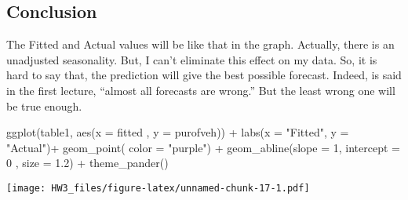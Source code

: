 \documentclass[
]{article}
\newenvironment{Shaded}{\begin{snugshade}}{\end{snugshade}}
\newcommand{\AttributeTok}[1]{\textcolor[rgb]{0.77,0.63,0.00}{#1}}
\newcommand{\DecValTok}[1]{\textcolor[rgb]{0.00,0.00,0.81}{#1}}
\newcommand{\FloatTok}[1]{\textcolor[rgb]{0.00,0.00,0.81}{#1}}
\newcommand{\FunctionTok}[1]{\textcolor[rgb]{0.00,0.00,0.00}{#1}}
\newcommand{\NormalTok}[1]{#1}
\newcommand{\OtherTok}[1]{\textcolor[rgb]{0.56,0.35,0.01}{#1}}
\newcommand{\SpecialCharTok}[1]{\textcolor[rgb]{0.00,0.00,0.00}{#1}}
\newcommand{\StringTok}[1]{\textcolor[rgb]{0.31,0.60,0.02}{#1}}
\begin{document}
\hypertarget{conclusion}{%
\subsection{Conclusion}\label{conclusion}}

The Fitted and Actual values will be like that in the graph. Actually,
there is an unadjusted seasonality. But, I can't eliminate this effect
on my data. So, it is hard to say that, the prediction will give the
best possible forecast. Indeed, is said in the first lecture, ``almost
all forecasts are wrong.'' But the least wrong one will be true enough.

\begin{Shaded}
\begin{Highlighting}[]
\FunctionTok{ggplot}\NormalTok{(table1, }\FunctionTok{aes}\NormalTok{(}\AttributeTok{x =}\NormalTok{ fitted , }\AttributeTok{y =}\NormalTok{ purofveh)) }\SpecialCharTok{+} \FunctionTok{labs}\NormalTok{(}\AttributeTok{x =} \StringTok{"Fitted"}\NormalTok{, }\AttributeTok{y =} \StringTok{"Actual"}\NormalTok{)}\SpecialCharTok{+} \FunctionTok{geom\_point}\NormalTok{( }\AttributeTok{color =} \StringTok{"purple"}\NormalTok{) }\SpecialCharTok{+} \FunctionTok{geom\_abline}\NormalTok{(}\AttributeTok{slope =} \DecValTok{1}\NormalTok{, }\AttributeTok{intercept =} \DecValTok{0}\NormalTok{ , }\AttributeTok{size =} \FloatTok{1.2}\NormalTok{) }\SpecialCharTok{+} \FunctionTok{theme\_pander}\NormalTok{()}
\end{Highlighting}
\end{Shaded}

\texttt{[image: HW3\_files/figure-latex/unnamed-chunk-17-1.pdf]}

\begin{Shaded}
\end{Shaded}
\end{document}
